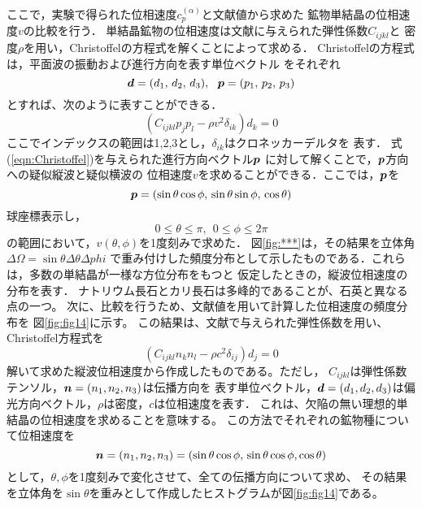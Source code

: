 ここで，実験で得られた位相速度$c_p^{(\alpha)}$と文献値から求めた
鉱物単結晶の位相速度$v$の比較を行う．
単結晶鉱物の位相速度は文献に与えられた弾性係数$C_{ijkl}$と
密度$\rho$を用い，Christoffelの方程式を解くことによって求める．
Christoffelの方程式は，平面波の振動および進行方向を表す単位ベクトル
をそれぞれ
\begin{equation}
	\fat{d}=(d_1,\, d_2,\, d_3), \ \ 
	\fat{p}=(p_1,\, p_2,\, p_3)
	\label{eqn:unit_vecs}
\end{equation}
とすれば、次のように表すことができる．
\begin{equation}
	\left( C_{ijkl}p_j p_l - \rho v^2 \delta_{ik} \right)d_k=0
	\label{eqn:Christoffel}
\end{equation}
ここでインデックスの範囲は1,2,3とし，$\delta_{ik}$はクロネッカーデルタを
表す．
式(\ref{eqn:Christoffel})を与えられた進行方向ベクトル$\mbox{\boldmath{$p$}}$
に対して解くことで，$\mbox{\boldmath{$p$}}$方向への疑似縦波と疑似横波の
位相速度$v$を求めることができる．ここでは，$\mbox{\boldmath{$p$}}$を
\begin{equation}
	\fat{p}=\left(
		\sin\theta \cos\phi, \,
		\sin\theta \sin\phi, \,
		\cos\theta
	\right)
	\label{eqn:p_polar}
\end{equation}
球座標表示し，
\begin{equation}
	0 \leq \theta \leq \pi, \ \ 
	0 \leq \phi \leq 2\pi
	\label{eqn:}
\end{equation}
の範囲において，$v(\theta, \phi)$を1度刻みで求めた．
図\ref{fig:***}は，その結果を立体角$\Delta \Omega = \sin\theta \Delta \theta \Delta phi$
で重み付けした頻度分布として示したものである．これらは，多数の単結晶が一様な方位分布をもつと
仮定したときの，縦波位相速度の分布を表す．
ナトリウム長石とカリ長石は多峰的であることが、石英と異なる点の一つ。
次に、比較を行うため、文献値を用いて計算した位相速度の頻度分布を
図\ref{fig:fig14}に示す。
この結果は、文献で与えられた弾性係数を用い、Christoffel方程式を
\begin{equation}
	\left( C_{ijkl}n_kn_l-\rho c^2\delta _{ij}\right)d_j =0
\end{equation}
解いて求めた縦波位相速度から作成したものである。ただし，
$C_{ijkl}$は弾性係数テンソル，$\mbox{\boldmath{$n$}}=(n_1,n_2,n_3)$は伝播方向を
表す単位ベクトル，$\mbox{\boldmath{$d$}}=(d_1,d_2,d_3)$は偏光方向ベクトル，$\rho$は密度，$c$は位相速度を表す．
これは、欠陥の無い理想的単結晶の位相速度を求めることを意味する。
この方法でそれぞれの鉱物種について位相速度を
\[
	\mbox{\boldmath{$n$}}=(n_1,n_2,n_3)=(\sin\theta\cos\phi,\, \sin\theta\cos\phi, \cos\theta)
\]
として，$\theta,\phi$を1度刻みで変化させて、全ての伝播方向について求め、
その結果を立体角を$\sin\theta$を重みとして作成したヒストグラムが図\ref{fig:fig14}である。
